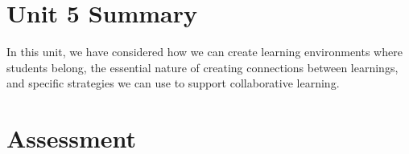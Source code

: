 \documentclass[
]{book}
\begin{document}
\hypertarget{unit-5-summary}{%
\section*{Unit 5 Summary}\label{unit-5-summary}}

In this unit, we have considered how we can create learning environments where students belong, the essential nature of creating connections between learnings, and specific strategies we can use to support collaborative learning.

\hypertarget{assessment-4}{%
\section*{Assessment}\label{assessment-4}}
\end{document}
